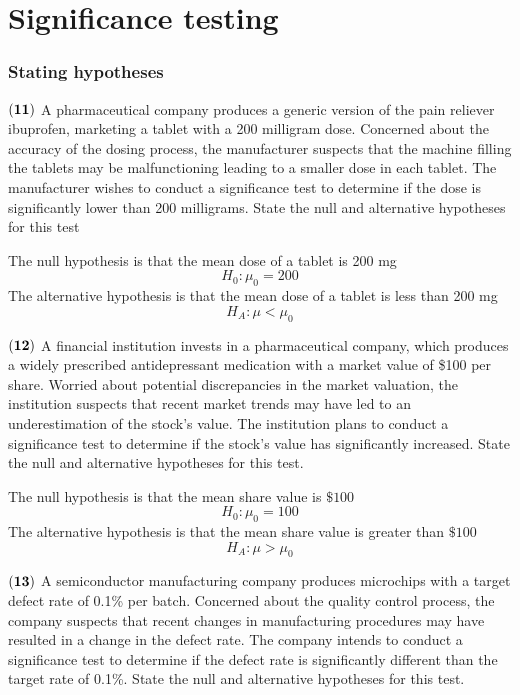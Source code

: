 \documentclass[
]{article}
\begin{document}
\section{Significance testing}\label{significance-testing}

\subsubsection{Stating hypotheses}\label{stating-hypotheses}

\(\bf (11)\) A pharmaceutical company produces a generic version of the
pain reliever ibuprofen, marketing a tablet with a 200 milligram dose.
Concerned about the accuracy of the dosing process, the manufacturer
suspects that the machine filling the tablets may be malfunctioning
leading to a smaller dose in each tablet. The manufacturer wishes to
conduct a significance test to determine if the dose is significantly
lower than 200 milligrams. State the null and alternative hypotheses for
this test

{ The null hypothesis is that the mean dose of a tablet is 200 mg
\[ H_0: \mu_0 = 200\] The alternative hypothesis is that the mean dose
of a tablet is less than 200 mg \[ H_A: \mu < \mu_0 \] }

\(\bf (12)\) A financial institution invests in a pharmaceutical
company, which produces a widely prescribed antidepressant medication
with a market value of \$100 per share. Worried about potential
discrepancies in the market valuation, the institution suspects that
recent market trends may have led to an underestimation of the stock's
value. The institution plans to conduct a significance test to determine
if the stock's value has significantly increased. State the null and
alternative hypotheses for this test.

{ The null hypothesis is that the mean share value is \(\$100\)
\[ H_0: \mu_0 = 100\] The alternative hypothesis is that the mean share
value is greater than \(\$100\) \[ H_A: \mu > \mu_0 \] }

\(\bf (13)\) A semiconductor manufacturing company produces microchips
with a target defect rate of 0.1\% per batch. Concerned about the
quality control process, the company suspects that recent changes in
manufacturing procedures may have resulted in a change in the defect
rate. The company intends to conduct a significance test to determine if
the defect rate is significantly different than the target rate of
0.1\%. State the null and alternative hypotheses for this test.
\end{document}
